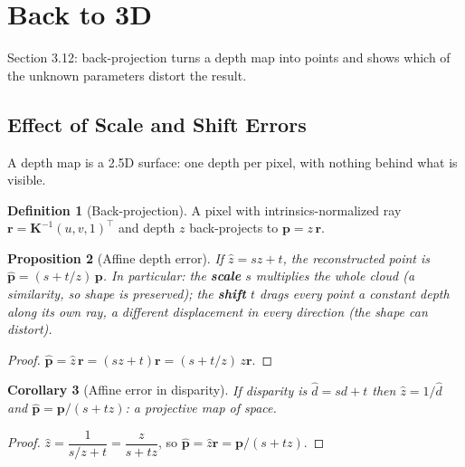 \documentclass[11pt,a4paper]{article}
\theoremstyle{definition}
\newtheorem{definition}{Definition}[section]
\theoremstyle{plain}
\newtheorem{proposition}[definition]{Proposition}
\newtheorem{corollary}[definition]{Corollary}
\theoremstyle{remark}
\begin{document}
\section{Back to 3D }
Section 3.12: back-projection turns a depth map into points and shows which of the unknown parameters distort the result.

\subsection{Effect of Scale and Shift Errors }
A depth map is a 2.5D surface: one depth per pixel, with nothing behind what is visible.

\begin{definition}[Back-projection]
\sloppy
{}
A pixel with intrinsics-normalized ray $\bm r=\bm K^{-1}(u,v,1)^\top$ and depth $z$ back-projects to $\bm p=z\,\bm r$.
\end{definition}

\begin{proposition}[Affine depth error]\label{prop:affine}
If $\hat z=sz+t$, the reconstructed point is $\hat{\bm p}=(s+t/z)\,\bm p$. In particular: the \textbf{scale} $s$ multiplies the whole cloud (a similarity, so shape is preserved); the \textbf{shift} $t$ drags every point a constant depth along its own ray, a different displacement in every direction (the shape can distort).
\end{proposition}
\begin{proof}
$\hat{\bm p}=\hat z\,\bm r=(sz+t)\bm r=(s+t/z)\,z\bm r$.
\end{proof}

\begin{corollary}[Affine error in disparity]
If disparity is $\hat d=sd+t$ then $\hat z=1/\hat d$ and $\hat{\bm p}=\bm p/(s+tz)$: a \emph{projective} map of space.
\end{corollary}
\begin{proof}
$\hat z=\dfrac{1}{s/z+t}=\dfrac{z}{s+tz}$, so $\hat{\bm p}=\hat z\bm r=\bm p/(s+tz)$.
\end{proof}
\end{document}

